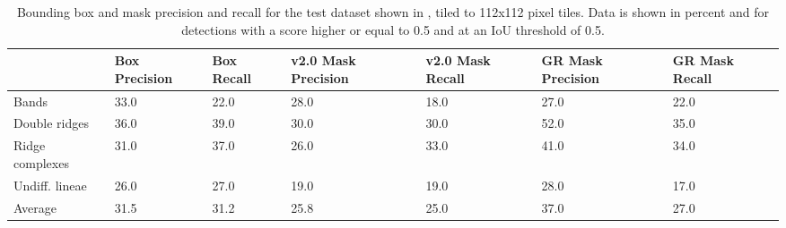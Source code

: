 \begin{table*}[]
\centering
\caption{Bounding box and mask precision and recall for the test dataset shown in , tiled to 112x112 pixel tiles. Data is shown in percent and for detections with a score higher or equal to 0.5 and at an IoU threshold of 0.5.}
\label{tab:prec_rec_iou05}
\begin{tabular}{@{}lP{1.8cm}P{1.8cm}P{1.8cm}P{1.8cm}P{1.8cm}P{1.8cm}@{}}
\toprule
 & \textbf{Box Precision} & \textbf{Box Recall} & \textbf{v2.0 Mask Precision} & \textbf{v2.0 Mask Recall} & \textbf{GR Mask Precision} & \textbf{GR Mask Recall} \\ \midrule
Bands & 33.0 & 22.0 & 28.0 & 18.0 & 27.0 & 22.0 \\
Double ridges & 36.0 & 39.0 & 30.0 & 30.0 & 52.0 & 35.0 \\
Ridge complexes & 31.0 & 37.0 & 26.0 & 33.0 & 41.0 & 34.0 \\
Undiff. lineae & 26.0 & 27.0 & 19.0 & 19.0 & 28.0 & 17.0 \\ \midrule
Average & 31.5 & 31.2 & 25.8 & 25.0 & 37.0 & 27.0 \\ \bottomrule
\end{tabular}
\end{table*}


